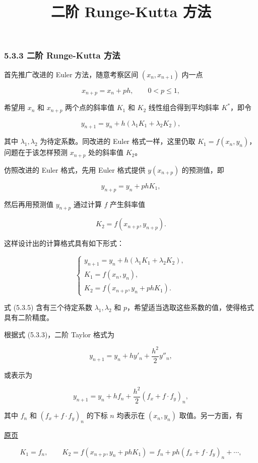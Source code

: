 \documentclass[
  10pt,
  fontset=fandol]{ctexart}
\title{二阶 Runge-Kutta 方法}
\author{}
\date{}
\begin{document}
\maketitle

\subsubsection{5.3.3 二阶 Runge-Kutta 方法}\label{ux4e8cux9636-runge-kutta-ux65b9ux6cd5}

首先推广改进的 Euler 方法，随意考察区间 \((x_n,x_{n+1})\) 内一点

\[
x_{n+p}=x_n+ph,\qquad 0<p\leqslant1,
\]

希望用 \(x_n\) 和 \(x_{n+p}\) 两个点的斜率值 \(K_1\) 和 \(K_2\) 线性组合得到平均斜率 \(K^*\)，即令

\[
y_{n+1}=y_n+h(\lambda_1K_1+\lambda_2K_2),
\]

其中 \(\lambda_1,\lambda_2\) 为待定系数。同改进的 Euler 格式一样，这里仍取 \(K_1=f(x_n,y_n)\)，问题在于该怎样预测 \(x_{n+p}\) 处的斜率值 \(K_2\)。

仿照改进的 Euler 格式，先用 Euler 格式提供 \(y(x_{n+p})\) 的预测值，即

\[
y_{n+p}=y_n+phK_1,
\]

然后再用预测值 \(y_{n+p}\) 通过计算 \(f\) 产生斜率值

\[
K_2=f(x_{n+p},y_{n+p}).
\]

这样设计出的计算格式具有如下形式：

\[
\begin{cases}
y_{n+1}=y_n+h(\lambda_1K_1+\lambda_2K_2),\\
K_1=f(x_n,y_n),\\
K_2=f(x_{n+p},y_n+phK_1).
\end{cases}\tag{5.3.5}
\]

式 (5.3.5) 含有三个待定系数 \(\lambda_1,\lambda_2\) 和 \(p\)，希望适当选取这些系数的值，使得格式具有二阶精度。

根据式 (5.3.3)，二阶 Taylor 格式为

\[
y_{n+1}=y_n+hy'_n+\frac{h^2}{2}y''_n,
\]

或表示为

\[
y_{n+1}=y_n+hf_n+\frac{h^2}{2}(f_x+f\cdot f_y)_n,
\]

其中 \(f_n\) 和 \((f_x+f\cdot f_y)_n\) 的下标 \(n\) 均表示在 \((x_n,y_n)\) 取值。另一方面，有

\href{../../source-images/pdf-129.jpeg}{原页}

\[
K_1=f_n,\qquad K_2=f(x_{n+p},y_n+phK_1)=f_n+ph(f_x+f\cdot f_y)_n+\cdots,
\]
\end{document}
